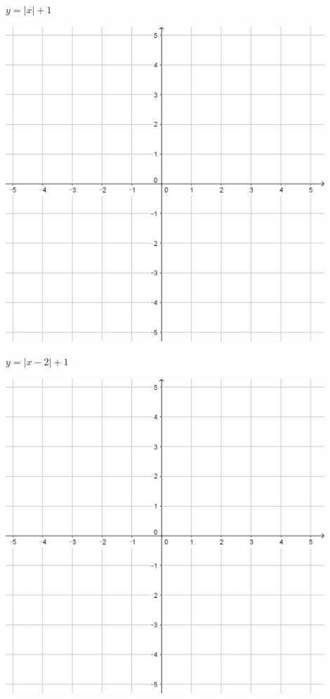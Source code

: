 \documentclass[a4paper]{oblivoir}
\begin{document}
\begin{minipage}{0.45\textwidth}\centering
\(y=|x|+1\)
\par\bigskip\includegraphics[width=0.9\textwidth]{55}
\end{minipage}
\begin{minipage}{0.45\textwidth}\centering
\(y=|x-2|+1\)
\par\bigskip\includegraphics[width=0.9\textwidth]{55}
\end{minipage}\bigskip\bigskip\par
\end{document}
